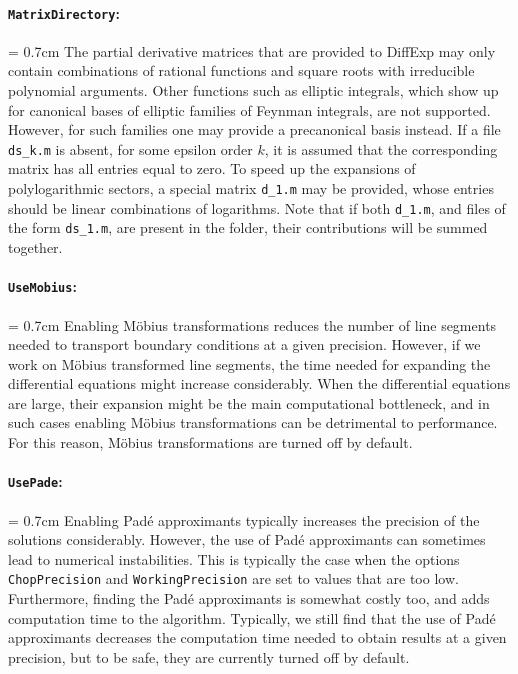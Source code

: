\documentclass{article}
\begin{document}
{
\paragraph{\texttt{MatrixDirectory}:} 
\parindent = 0.7cm \hangindent=0.7cm
The partial derivative matrices that are provided to DiffExp may only contain combinations of rational functions and square roots with irreducible polynomial arguments. Other functions such as elliptic integrals, which show up for canonical bases of elliptic families of Feynman integrals, are not supported. However, for such families one may provide a precanonical basis instead. If a file \texttt{ds\_k.m} is absent, for some epsilon order $k$, it is assumed that the corresponding matrix has all entries equal to zero. To speed up the expansions of polylogarithmic sectors, a special matrix \texttt{d\_1.m} may be provided, whose entries should be linear combinations of logarithms. Note that if both \texttt{d\_1.m}, and files of the form \texttt{ds\_1.m}, are present in the folder, their contributions will be summed together.

}

{
\paragraph{{ \tt UseMobius}:} 
\parindent = 0.7cm \hangindent=0.7cm
Enabling Möbius transformations reduces the number of line segments needed to transport boundary conditions at a given precision. However, if we work on Möbius transformed line segments, the time needed for expanding the differential equations might increase considerably. When the differential equations are large, their expansion might be the main computational bottleneck, and in such cases enabling Möbius transformations can be detrimental to performance. For this reason, Möbius transformations are turned off by default.

}

{
\paragraph{\texttt{UsePade}:}
\parindent = 0.7cm \hangindent=0.7cm
Enabling Padé approximants typically increases the precision of the solutions considerably. However, the use of Padé approximants can sometimes lead to numerical instabilities. This is typically the case when the options \texttt{ChopPrecision} and \texttt{WorkingPrecision} are set to values that are too low. Furthermore, finding the Padé approximants is somewhat costly too, and adds computation time to the algorithm. Typically, we still find that the use of Padé approximants decreases the computation time needed to obtain results at a given precision, but to be safe, they are currently turned off by default.

}
\end{document}
